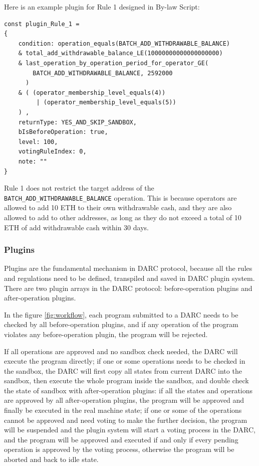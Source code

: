 \documentclass[main.tex]{subfiles}
\begin{document}
Here is an example plugin for Rule 1 designed in By-law Script:

\begin{verbatim}
const plugin_Rule_1 = 
{
    condition: operation_equals(BATCH_ADD_WITHDRAWABLE_BALANCE)
    & total_add_withdrawable_balance_LE(10000000000000000000)
    & last_operation_by_operation_period_for_operator_GE(
        BATCH_ADD_WITHDRAWABLE_BALANCE, 2592000
      )
    & ( (operator_membership_level_equals(4)) 
         | (operator_membership_level_equals(5)) 
    ) ,
    returnType: YES_AND_SKIP_SANDBOX,
    bIsBeforeOperation: true,
    level: 100,
    votingRuleIndex: 0,
    note: ""
}
\end{verbatim}

Rule 1 does not restrict the target address of the \texttt{BATCH\_ADD\_WITHDRAWABLE\_BALANCE} operation. This is because operators are allowed to add 10 ETH to their own withdrawable cash, and they are also allowed to add to other addresses, as long as they do not exceed a total of 10 ETH of add withdrawable cash within 30 days.

\subsubsection{Plugins}

Plugins are the fundamental mechanism in DARC protocol, because all the rules and regulations need to be defined, transpiled and saved in DARC plugin system. There are two plugin arrays in the DARC protocol: before-operation plugins and after-operation plugins.


In the figure \ref{fig:workflow}, each program submitted to a DARC needs to be checked by all before-operation plugins, and if any operation of the program violates any before-operation plugin, the program will be rejected. 

If all operations are approved and no sandbox check needed, the DARC will execute the program directly; if one or some operations needs to be checked in the sandbox, the DARC will first copy all states from current DARC into the sandbox, then execute the whole program inside the sandbox, and double check the state of sandbox with after-operation plugins: if all the states and operations are approved by all after-operation plugins, the program will be approved and finally be executed in the real machine state; if one or some of the operations cannot be approved and need voting to make the further decision, the program will be suspended and the plugin system will start a voting process in the DARC, and the program will be approved and executed if and only if every pending operation is approved by the voting process, otherwise the program will be aborted and back to idle state.
\end{document}
